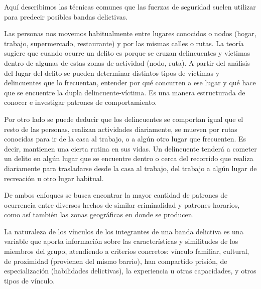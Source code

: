 
Aquí describimos las técnicas comunes que las fuerzas de seguridad suelen utilizar para predecir posibles bandas delictivas. 

Las personas nos movemos habitualmente entre lugares conocidos o nodos (hogar, trabajo, supermercado, restaurante) y por las mismas calles o rutas. La teoría sugiere que cuando ocurre un delito es porque se cruzan delincuentes y víctimas dentro de algunas de estas zonas de actividad (nodo, ruta). A partir del análisis del lugar del delito se pueden determinar distintos tipos de víctimas y delincuentes que lo frecuentan, entender por qué concurren a ese lugar y qué hace que se encuentre la dupla delincuente-víctima. Es una manera estructurada de conocer e investigar patrones de comportamiento.

Por otro lado se puede deducir que los delincuentes se comportan igual que el resto de las personas, realizan actividades diariamente, se mueven por rutas conocidas para ir de la casa al trabajo, o a algún otro lugar que frecuenten. Es decir, mantienen una cierta rutina en sus vidas. Un delincuente tenderá a cometer un delito en algún lugar que se encuentre dentro o cerca del recorrido que realiza diariamente para trasladarse desde la casa al trabajo, del trabajo a algún lugar de recreación u otro lugar habitual.

De ambos enfoques se busca encontrar la mayor cantidad de patrones de ocurrencia entre diversos hechos de similar criminalidad y patrones horarios, como así también las zonas geográficas en donde se producen.  

La naturaleza de los vínculos de los integrantes de una banda delictiva es una variable que aporta información sobre las características y similitudes de los miembros del grupo, atendiendo a criterios concretos: vínculo familiar, cultural, de proximidad (provienen del mismo barrio), han compartido prisión, de especialización (habilidades delictivas), la experiencia u otras capacidades, y otros tipos de vínculo.
